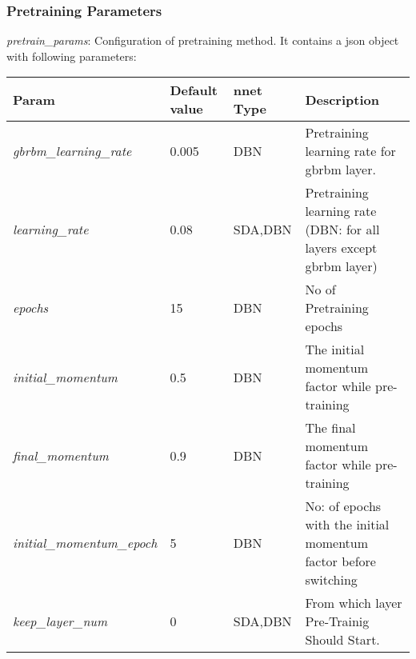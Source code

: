 \subsubsection{Pretraining Parameters}
\label{subsec:pretrainparam}
\emph{pretrain\_params}: Configuration of pretraining method. It contains a json object with following parameters:
\begin{table}[h]
\centering
\begin{tabular}{|l|l|l|p{6cm}|}
\hline
 Param	 & Default value	 & nnet Type	 & Description\\
\hline
 \emph{gbrbm\_learning\_rate}	 &     0.005	 &    DBN	 & Pretraining learning rate for gbrbm layer.\\
 \emph{learning\_rate}	 &      0.08	 &  SDA,DBN	 & Pretraining learning rate (DBN: for all layers except gbrbm layer)\\
 \emph{epochs}	 &       15	 &    DBN	 & No of Pretraining epochs\\
 \emph{initial\_momentum}	 &      0.5	 &    DBN	 & The initial momentum factor while pre-training\\
 \emph{final\_momentum}	 &      0.9	 &    DBN	 & The final momentum factor while pre-training\\
 \emph{initial\_momentum\_epoch}	 &       5	 &    DBN	 & No: of epochs with the initial momentum factor before switching\\
 \emph{keep\_layer\_num}	 &       0	 &  SDA,DBN	 & From which layer Pre-Trainig Should Start.\\
 \hline
\end{tabular}
\end{table}

